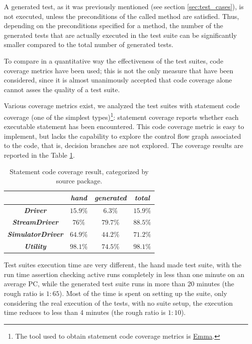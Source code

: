 \documentclass{article} \usepackage{times}
\newcommand{\myhref}[2]{\ifpdf\href{#1}{#2}\else\htmladdnormallinkfoot{#2}{#1}\fi}
\begin{document}
A generated test, as it was previously mentioned (see section
\ref{sec:test_cases}), is not executed, unless the preconditions of
the called method are satisfied. Thus, depending on the preconditions
specified for a method, the number of the generated tests that are
actually executed in the test suite can be significantly smaller 
compared to the total number of generated tests.

To compare in a quantitative way the effectiveness of the test suites,
code coverage metrics have been used; this is not the only measure
that have been considered, since it is almost unanimously accepted
that code coverage alone cannot asses the quality of a test
suite\cite{Marick1999,Chockler2006}.

Various coverage metrics exist, we analyzed the test suites with
statement code coverage (one of the simplest types)\footnote{The tool
  used to obtain statement code coverage metrics is
  \myhref{http://emma.sourceforge.net/}{Emma}.}: statement coverage
reports whether each executable statement has been encountered. This
code coverage metric is easy to implement, but lacks the capability to
explore the control flow graph associated to the code, that is,
decision branches are not explored. The coverage results are reported
in the Table \ref{tab:statement_code_coverage}.

\begin{table}[htbp]
  \caption{Statement code coverage result, categorized by source package.}
  \label{tab:statement_code_coverage}
  \begin{center}
    \begin{tabular}{|c|c|c|c|}\hline
      & \textbf{\textit{hand}} & \textbf{\textit{generated}} &
      \textbf{\textit{total}} \\\hline
      \textbf{\textit{Driver}} & $15.9 \%$ & $6.3 \%$ & $15.9 \%$ \\\hline
      \textbf{\textit{StreamDriver}} & $76 \%$ & $79.7 \%$ & $88.5 \%$ \\\hline
      \textbf{\textit{SimulatorDriver}} & $64.9 \%$ & $44.2 \%$ &
      $71.2 \%$ \\\hline
      \textbf{\textit{Utility}} & $98.1 \%$ & $74.5 \%$ & $98.1 \%$ \\\hline
    \end{tabular}
  \end{center}
\end{table}

Test suites execution time are very different, the hand made test suite, with the
run time assertion checking active runs completely in less than one
minute on an average PC, while the generated test suite runs in more
than 20 minutes (the rough ratio is $ 1 : 65 $). Most of the time is
spent on setting up the suite, only considering the real execution of
the tests, with no suite setup, the execution time reduces to less
than 4 minutes (the rough ratio is $ 1 : 10 $).
\end{document}
